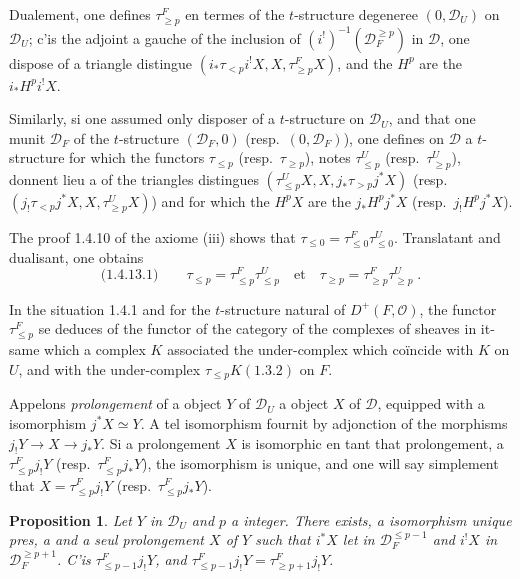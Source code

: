 \documentclass[12pt,a4paper]{article}
\theoremstyle{plain}
\newtheorem{proposition}[theorem]{Proposition}
\theoremstyle{definition}
\begin{document}
Dualement, one defines $\tau_{\geqslant p}^F$ en termes of the $t$-structure degeneree $(0, \mathcal{D}_U)$ on $\mathcal{D}_U$; c'is the adjoint a gauche of the inclusion of $(i^!)^{-1}(\mathcal{D}_F^{\geqslant p})$ in $\mathcal{D}$, one dispose of a triangle distingue $(i_*\tau_{<p}i^!X, X, \tau_{\geqslant p}^F X)$, and the $H^p$ are the $i_*H^p i^!X$.

Similarly, si one assumed only disposer of a $t$-structure on $\mathcal{D}_U$, and that one munit $\mathcal{D}_F$ of the $t$-structure $(\mathcal{D}_F, 0)$ (resp.\ $(0, \mathcal{D}_F)$), one defines on $\mathcal{D}$ a $t$-structure for which the functors $\tau_{\leqslant p}$ (resp.\ $\tau_{\geqslant p}$), notes $\tau_{\leqslant p}^U$ (resp.\ $\tau_{\geqslant p}^U$), donnent lieu a of the triangles distingues $(\tau_{\leqslant p}^U X, X, j_*\tau_{>p}j^*X)$ (resp.\ $(j_!\tau_{<p}j^*X, X, \tau_{\geqslant p}^U X)$) and for which the $H^p X$ are the $j_*H^p j^*X$ (resp.\ $j_!H^p j^*X$).

The proof 1.4.10 of the axiome (iii) shows that $\tau_{\leqslant 0} = \tau_{\leqslant 0}^F \tau_{\leqslant 0}^U$. Translatant and dualisant, one obtains
\[
\text{(1.4.13.1)}\qquad \tau_{\leqslant p} = \tau_{\leqslant p}^F \tau_{\leqslant p}^U \quad\text{et}\quad \tau_{\geqslant p} = \tau_{\geqslant p}^F \tau_{\geqslant p}^U\;.
\]

In the situation 1.4.1 and for the $t$-structure natural of $D^+(F, \mathcal{O})$, the functor $\tau_{\leqslant p}^F$ se deduces of the functor of the category of the complexes of sheaves in it-same which a complex $K$ associated the under-complex which co\"incide with $K$ on $U$, and with the under-complex $\tau_{\leqslant p}K(1.3.2)$ on $F$.

Appelons \emph{prolongement} of a object $Y$ of $\mathcal{D}_U$ a object $X$ of $\mathcal{D}$, equipped with a isomorphism $j^*X \simeq Y$. A tel isomorphism fournit by adjonction of the morphisms $j_!Y \to X \to j_*Y$. Si a prolongement $X$ is isomorphic en tant that prolongement, a $\tau_{\leqslant p}^F j_!Y$ (resp.\ $\tau_{\leqslant p}^F j_*Y$), the isomorphism is unique, and one will say simplement that $X = \tau_{\leqslant p}^F j_!Y$ (resp.\ $\tau_{\leqslant p}^F j_*Y$).

\begin{proposition}\label{prop:1.4.14}
Let $Y$ in $\mathcal{D}_U$ and $p$ a integer. There exists, a isomorphism unique pres, a and a seul prolongement $X$ of $Y$ such that $i^*X$ let in $\mathcal{D}_F^{\leqslant p-1}$ and $i^!X$ in $\mathcal{D}_F^{\geqslant p+1}$. C'is $\tau_{\leqslant p-1}^F j_!Y$, and $\tau_{\leqslant p-1}^F j_!Y = \tau_{\geqslant p+1}^F j_!Y$.
\end{proposition}
\end{document}
